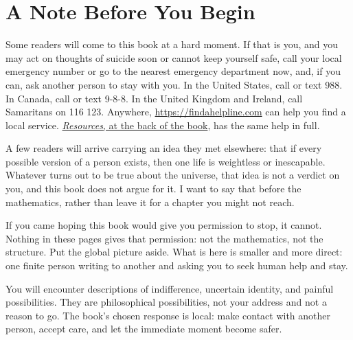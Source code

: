 \chapter*{A Note Before You Begin}

Some readers will come to this book at a hard moment. If that is you, and you may act on thoughts of suicide soon or cannot keep yourself safe, call your local emergency number or go to the nearest emergency department now, and, if you can, ask another person to stay with you. In the United States, call or text 988. In Canada, call or text 9-8-8. In the United Kingdom and Ireland, call Samaritans on 116 123. Anywhere, \url{https://findahelpline.com} can help you find a local service. \hyperref[resources]{\textit{Resources}, at the back of the book}, has the same help in full.

A few readers will arrive carrying an idea they met elsewhere: that if every possible version of a person exists, then one life is weightless or inescapable. Whatever turns out to be true about the universe, that idea is not a verdict on you, and this book does not argue for it. I want to say that before the mathematics, rather than leave it for a chapter you might not reach.

If you came hoping this book would give you permission to stop, it cannot. Nothing in these pages gives that permission: not the mathematics, not the structure. Put the global picture aside. What is here is smaller and more direct: one finite person writing to another and asking you to seek human help and stay.

You will encounter descriptions of indifference, uncertain identity, and painful possibilities. They are philosophical possibilities, not your address and not a reason to go. The book's chosen response is local: make contact with another person, accept care, and let the immediate moment become safer.
